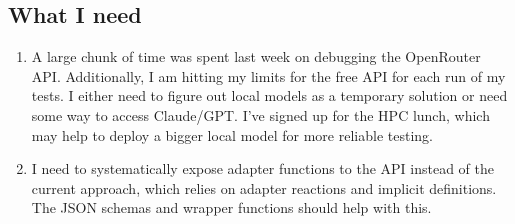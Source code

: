\documentclass[12pt]{article}
\begin{document}
\subsection*{What I need}
\begin{enumerate}[leftmargin=1.5em]
    \item A large chunk of time was spent last week on debugging the OpenRouter API. Additionally, I am hitting my limits for the free API for each run of my tests. I either need to figure out local models as a temporary solution or need some way to access Claude/GPT. I've signed up for the HPC lunch, which may help to deploy a bigger local model for more reliable testing.
    \item I need to systematically expose adapter functions to the API instead of the current approach, which relies on adapter reactions and implicit definitions. The JSON schemas and wrapper functions should help with this.
\end{enumerate}
\end{document}
